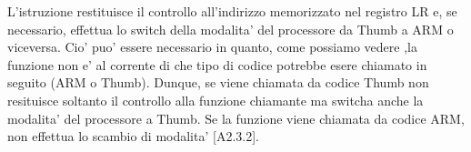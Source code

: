 
L'istruzione  restituisce il controllo all'indirizzo memorizzato nel registro \ac{LR} e, se necessario, 
effettua lo switch della modalita' del processore da Thumb a ARM o viceversa.
Cio' puo' essere necessario in quanto, come possiamo vedere ,la funzione \ttf non e' al corrente di che tipo di codice potrebbe esere chiamato in seguito (ARM o Thumb).
Dunque, se viene chiamata da codice Thumb  non resituisce soltanto il controllo alla funzione chiamante ma switcha anche la modalita' del processore a Thumb. 
Se la funzione viene chiamata da codice ARM, non effettua lo scambio di modalita' [\ARMSevenRef A2.3.2].
